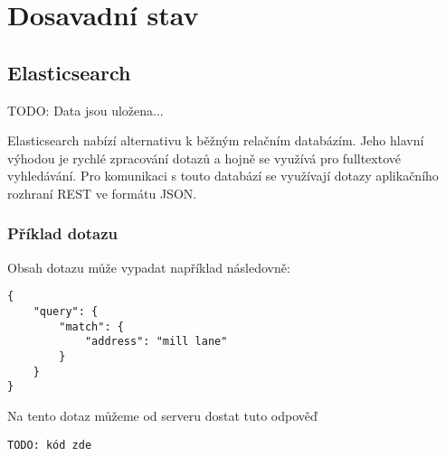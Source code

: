 \chapter{Dosavadní stav}

\section{Elasticsearch}
TODO: Data jsou uložena...

Elasticsearch nabízí alternativu k běžným relačním databázím. Jeho hlavní výhodou je rychlé zpracování dotazů a hojně se využívá pro fulltextové vyhledávání. Pro komunikaci s touto databází se využívají dotazy aplikačního rozhraní REST ve formátu JSON.

\subsection{Příklad dotazu}
Obsah dotazu může vypadat například následovně:
\begin{verbatim}
{
    "query": {
        "match": {
            "address": "mill lane"
        }
    }
}
\end{verbatim}

Na tento dotaz můžeme od serveru dostat tuto odpověď
\begin{verbatim}
TODO: kód zde
\end{verbatim}